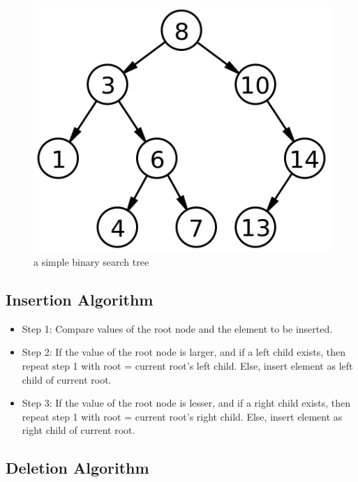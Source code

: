 \documentclass[12pt]{article}
\begin{document}
  \begin{figure}[h]
  \includegraphics[width=\linewidth/2]{binarytree.png}
    \centering
    \caption{a simple binary search tree}
  \end{figure}
\subsection{Insertion Algorithm}
    \begin{itemize}
        \item Step 1: Compare values of the root node and the element to be inserted.
        
        \item Step 2: If the value of the root node is larger, and if a left child exists, then repeat step 1 with root = current root's left child. Else, insert element as left child of current root.
        
        \item Step 3: If the value of the root node is lesser, and if a right child exists, then repeat step 1 with root = current root's right child. Else, insert element as right child of current root.

    \end{itemize}



\newpage
\subsection{Deletion Algorithm}
\end{document}
